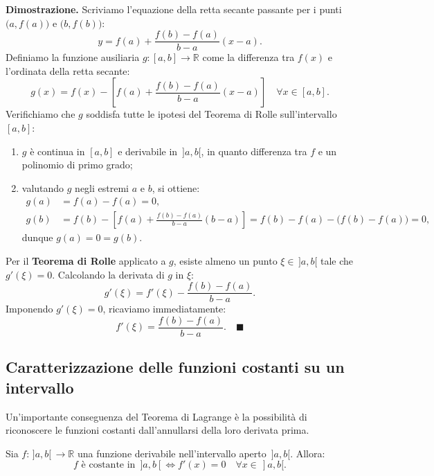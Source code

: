 \noindent\textbf{Dimostrazione.} Scriviamo l'equazione della retta secante passante per i punti $\bigl(a, f(a)\bigr)$ e $\bigl(b, f(b)\bigr)$:
\[
    y = f(a) + \frac{f(b) - f(a)}{b - a}(x - a).
\]
Definiamo la funzione ausiliaria $g \colon [a,b] \to \mathbb{R}$ come la differenza tra $f(x)$ e l'ordinata della retta secante:
\[
    g(x) = f(x) - \left[ f(a) + \frac{f(b) - f(a)}{b - a}(x - a) \right] \quad \forall x \in [a,b].
\]
Verifichiamo che $g$ soddisfa tutte le ipotesi del Teorema di Rolle sull'intervallo $[a,b]$:
\begin{enumerate}
    \item $g$ è continua in $[a,b]$ e derivabile in $\,]a,b[$, in quanto differenza tra $f$ e un polinomio di primo grado;
    \item valutando $g$ negli estremi $a$ e $b$, si ottiene:
    \begin{align*}
        g(a) &= f(a) - f(a) = 0, \\
        g(b) &= f(b) - \left[ f(a) + \frac{f(b) - f(a)}{b - a}(b - a) \right] = f(b) - f(a) - \bigl(f(b) - f(a)\bigr) = 0,
    \end{align*}
    dunque $g(a) = 0 = g(b)$.
\end{enumerate}
Per il \textbf{Teorema di Rolle} applicato a $g$, esiste almeno un punto $\xi \in \,]a,b[$ tale che $g'(\xi) = 0$. Calcolando la derivata di $g$ in $\xi$:
\[
    g'(\xi) = f'(\xi) - \frac{f(b) - f(a)}{b - a}.
\]
Imponendo $g'(\xi) = 0$, ricaviamo immediatamente:
\[
    f'(\xi) = \frac{f(b) - f(a)}{b - a}. \quad \blacksquare
\]

\subsection{Caratterizzazione delle funzioni costanti su un intervallo}

Un'importante conseguenza del Teorema di Lagrange è la possibilità di riconoscere le funzioni costanti dall'annullarsi della loro derivata prima.

\begin{propbox}
Sia $f \colon \,]a,b[\, \to \mathbb{R}$ una funzione derivabile nell'intervallo aperto $\,]a,b[$. Allora:
\[
    f \text{ è costante in } \,]a,b[ \iff f'(x) = 0 \quad \forall x \in \,]a,b[.
\]
\end{propbox}

